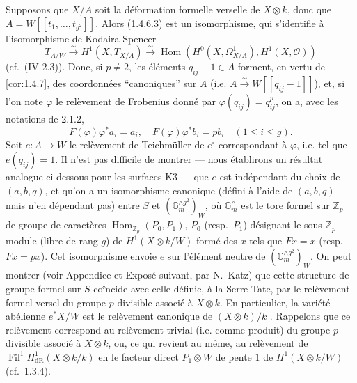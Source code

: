 \documentclass[12pt,a4paper]{article}
\theoremstyle{plain}
\theoremstyle{definition}
\theoremstyle{remark}
\DeclareMathOperator{\Fil}{Fil}
\DeclareMathOperator{\Hom}{Hom}
\providecommand{\Hom}{\operatorname{Hom}}
\begin{document}
\subsubsection{}
Supposons que $X/A$ soit la d\'eformation formelle verselle de $X \otimes k$, donc que $A = W[[t_1, \ldots, t_{g^2}]]$. Alors (1.4.6.3) est un isomorphisme, qui s'identifie \`a l'isomorphisme de Kodaira-Spencer
\[
T_{A/W} \xrightarrow{\sim} H^1(X, T_{X/A}) \xrightarrow{\sim} \Hom(H^0(X, \Omega^1_{X/A}), H^1(X, \mathcal{O}))
\]
(cf.\ (IV 2.3)). Donc, si $p \neq 2$, les \'el\'ements $q_{ij} - 1 \in A$ forment, en vertu de \ref{cor:1.4.7}, des coordonn\'ees ``canoniques'' sur $A$ (i.e. $A \xrightarrow{\sim} W[[q_{ij} - 1]]$), et, si l'on note $\varphi$ le rel\`evement de Frobenius donn\'e par $\varphi(q_{ij}) = q_{ij}^p$, on a, avec les notations de 2.1.2,
\[
F(\varphi)\varphi^*a_i = a_i, \quad F(\varphi)\varphi^*b_i = pb_i \quad (1 \leqslant i \leqslant g).
\]
Soit $e : A \to W$ le rel\`evement de Teichm\"uller de $e^\circ$ correspondant \`a $\varphi$, i.e. tel que $e(q_{ij}) = 1$. Il n'est pas difficile de montrer --- nous \'etablirons un r\'esultat analogue ci-dessous pour les surfaces K3 --- que $e$ est ind\'ependant du choix de $(a, b, q)$, et qu'on a un isomorphisme canonique (d\'efini \`a l'aide de $(a, b, q)$ mais n'en d\'ependant pas) entre $S$ et $(\mathbb{G}_m^{\wedge g^2})_W$, o\`u $\mathbb{G}_m^{\wedge}$ est le tore formel sur $\mathbb{Z}_p$ de groupe de caract\`eres $\Hom_{\mathbb{Z}_p}(P_0, P_1)$, $P_0$ (resp.\ $P_1$) d\'esignant le sous-$\mathbb{Z}_p$-module (libre de rang $g$) de $H^1(X \otimes k/W)$ form\'e des $x$ tels que $Fx = x$ (resp.\ $Fx = px$). Cet isomorphisme envoie $e$ sur l'\'el\'ement neutre de $(\mathbb{G}_m^{\wedge g^2})_W$. On peut montrer (voir Appendice et Expos\'e suivant, par N.~Katz) que cette structure de groupe formel sur $S$ co\^incide avec celle d\'efinie, \`a la Serre-Tate, par le rel\`evement formel versel du groupe $p$-divisible associ\'e \`a $X \otimes k$. En particulier, la vari\'et\'e ab\'elienne $e^*X/W$ est le rel\`evement canonique de $(X \otimes k)/k$ \cite[\S V \S 3]{Messing}. Rappelons que ce rel\`evement correspond au rel\`evement trivial (i.e. comme produit) du groupe $p$-divisible associ\'e \`a $X \otimes k$, ou, ce qui revient au m\^eme, au rel\`evement de $\Fil^1 H^1_\mathrm{dR}(X \otimes k/k)$ en le facteur direct $P_1 \otimes W$ de pente $1$ de $H^1(X \otimes k/W)$ (cf.\ 1.3.4).
\end{document}
